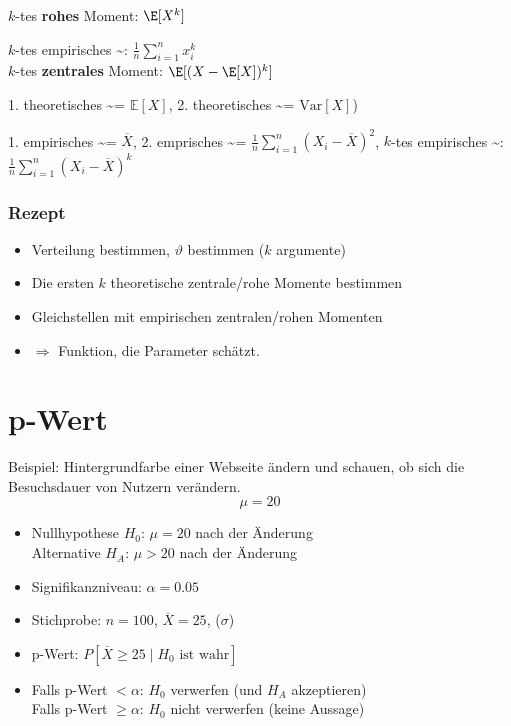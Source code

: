 $k$-tes \textbf{rohes} Moment: $\E[X^k]$

$k$-tes empirisches \textasciitilde: $\frac{1}{n}\sum_{i=1}^nx_i^k$\\

$k$-tes \textbf{zentrales} Moment: $\E[(X - \E[X])^k]$

1. theoretisches \textasciitilde = $\mathbb{E}[X]$, 2. theoretisches \textasciitilde = $\text{Var}[X]$)

1. empirisches \textasciitilde = $\overline{X}$, 2. emprisches \textasciitilde = $\frac{1}{n}\sum_{i=1}^n(X_i-\overline{X})^2$, $k$-tes empirisches \textasciitilde: $\frac{1}{n}\sum_{i=1}^n(X_i-\overline{X})^k$

\subsubsection{Rezept}

\begin{itemize}
	\item Verteilung bestimmen, $\vartheta$ bestimmen ($k$ argumente)
	\item Die ersten $k$ theoretische zentrale/rohe Momente bestimmen
	\item Gleichstellen mit empirischen zentralen/rohen Momenten
	\item $\Rightarrow$ Funktion, die Parameter schätzt.
\end{itemize}

\section{p-Wert}

Beispiel: Hintergrundfarbe einer Webseite ändern und schauen, ob sich die Besuchsdauer von Nutzern verändern. $$\mu = 20$$

\begin{itemize}
	\item Nullhypothese $H_0$: $\mu = 20$ nach der Änderung\\Alternative $H_A$: $\mu > 20$ nach der Änderung
	\item Signifikanzniveau: $\alpha = 0.05$
	\item Stichprobe: $n=100$, $\overline{X} = 25$, ($\sigma$)
	\item p-Wert: $P[\overline{X} \geq 25 \mid H_0 \text{ ist wahr}]$
	\item Falls p-Wert $< \alpha$: $H_0$ verwerfen (und $H_A$ akzeptieren)\\Falls p-Wert $\geq \alpha$: $H_0$ nicht verwerfen (keine Aussage)
\end{itemize}

